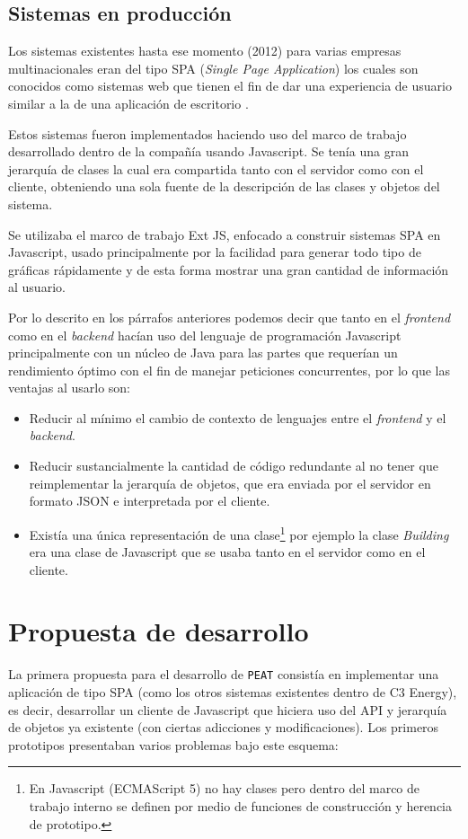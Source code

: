 \subsection{Sistemas en producción}
Los sistemas existentes hasta ese momento (2012) para varias empresas multinacionales
eran del tipo SPA (\textit{Single Page Application}) los cuales son conocidos como
sistemas web que tienen el fin de dar una experiencia de usuario similar a la
de una aplicación de escritorio \cite{21_mikowski_powell}.

Estos sistemas fueron implementados haciendo uso del marco de trabajo desarrollado
dentro de la compañía usando Javascript. Se tenía una gran jerarquía de clases
la cual era compartida tanto con el servidor como con el cliente, obteniendo una
sola fuente de la descripción de las clases y objetos del sistema.

Se utilizaba el marco de trabajo Ext JS, enfocado a construir sistemas SPA
en Javascript, usado principalmente por la facilidad para generar
todo tipo de gráficas rápidamente y de esta forma mostrar una gran cantidad
de información al usuario.

Por lo descrito en los párrafos anteriores podemos decir que tanto en el
\textit{frontend} como en el \textit{backend} hacían uso del lenguaje
de programación Javascript principalmente con un núcleo de Java para las partes
que requerían un rendimiento óptimo con el fin de manejar peticiones concurrentes,
por lo que las ventajas al usarlo son:

\begin{itemize}
\item Reducir al mínimo el cambio de contexto de lenguajes entre
  el \textit{frontend} y el \textit{backend}.
\item Reducir sustancialmente la cantidad de código redundante al no
  tener que reimplementar la jerarquía de objetos, que era enviada
  por el servidor en formato JSON e interpretada por el cliente.
\item Existía una única representación de una clase\footnote{En Javascript
  (ECMAScript 5) no hay clases pero dentro del marco de trabajo interno se definen
  por medio de funciones de construcción y herencia de prototipo.} por ejemplo la
  clase \textit{Building} era una clase de Javascript que se usaba
  tanto en el servidor como en el cliente.
\end{itemize}

\section{Propuesta de desarrollo}
La primera propuesta para el desarrollo de \texttt{PEAT} consistía
en implementar una aplicación de tipo SPA (como los otros sistemas
existentes dentro de C3 Energy), es decir, desarrollar un cliente
de Javascript que hiciera uso del API y jerarquía de objetos
ya existente (con ciertas adicciones y modificaciones).
Los primeros prototipos presentaban varios problemas bajo este esquema:

